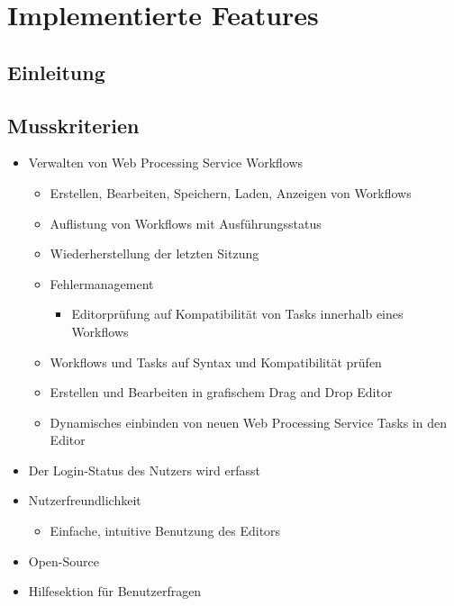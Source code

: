 \chapter{Implementierte Features}
    
    \section{Einleitung}
    
    
    \section{Musskriterien}
    
        \begin{itemize}
			\item Verwalten von \gls{Web Processing Service} Workflows
				\begin{itemize}
					\item Erstellen, Bearbeiten, Speichern, Laden, Anzeigen von Workflows
					\item Auflistung von Workflows mit Ausführungsstatus
					\item Wiederherstellung der letzten Sitzung
					\item Fehlermanagement
					    \begin{itemize}
                        	\item Editorprüfung auf Kompatibilität von Tasks innerhalb eines Workflows
                        \end{itemize}
					\item Workflows und \Gls{Task}s auf Syntax und Kompatibilität prüfen
					\item Erstellen und Bearbeiten in grafischem \Gls{Drag and Drop} Editor
					\item Dynamisches einbinden von neuen \gls{Web Processing Service} Tasks in den Editor
				\end{itemize}
			\item Der Login-Status des Nutzers wird erfasst
			\item Nutzerfreundlichkeit
				\begin{itemize}
					\item Einfache, intuitive Benutzung des Editors
				\end{itemize}
			\item Open-Source
			\item Hilfesektion für Benutzerfragen
		\end{itemize}

